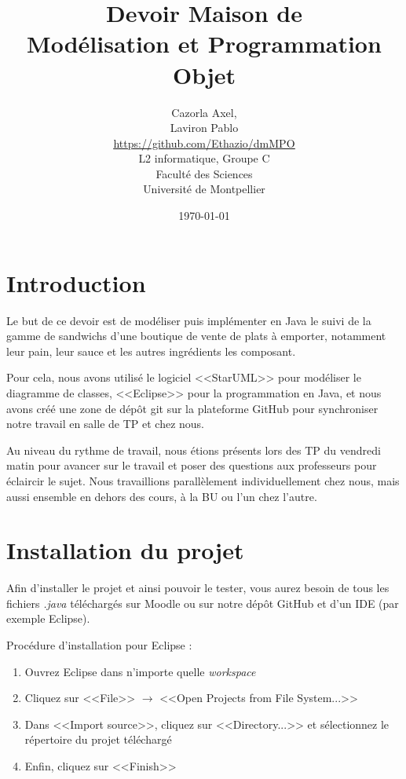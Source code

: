 \documentclass[a4paper]{article}
\title{Devoir Maison de\\
  Modélisation et Programmation Objet}
\author{Cazorla Axel,\\
  Laviron Pablo\\  
  \href{https://github.com/Ethazio/dmMPO}{\underline{https://github.com/Ethazio/dmMPO}}\\
  L2 informatique, Groupe C\\
  Faculté des Sciences\\
  Université de Montpellier}
\date{\today}
\begin{document}
\maketitle


\section{Introduction}


  Le but de ce devoir est de modéliser puis implémenter en Java le suivi de la gamme de sandwichs d'une boutique de vente de plats à emporter, notamment leur pain, leur sauce et les autres ingrédients les composant.

  Pour cela, nous avons utilisé le logiciel <<StarUML>> pour modéliser le diagramme de classes, <<Eclipse>> pour la programmation en Java, et nous avons créé une zone de dépôt git sur la plateforme GitHub pour synchroniser notre travail en salle de TP et chez nous.

  Au niveau du rythme de travail, nous étions présents lors des TP du vendredi matin pour avancer sur le travail et poser des questions aux professeurs pour éclaircir le sujet. Nous travaillions parallèlement individuellement chez nous, mais aussi ensemble en dehors des cours, à la BU ou l'un chez l'autre.

\section{Installation du projet}


  Afin d'installer le projet et ainsi pouvoir le tester, vous aurez besoin de tous les fichiers \emph{.java} téléchargés sur Moodle ou sur notre dépôt GitHub et d'un IDE (par exemple Eclipse).

  Procédure d'installation pour Eclipse :
  \begin{enumerate}
    \item
    Ouvrez Eclipse dans n'importe quelle \emph{workspace}
    \item
    Cliquez sur <<File>> $\rightarrow$ <<Open Projects from File System...>>
    \item
    Dans <<Import source>>, cliquez sur <<Directory...>> et sélectionnez le répertoire du projet téléchargé
    \item
    Enfin, cliquez sur <<Finish>>
  \end{enumerate}
  
\end{document}

